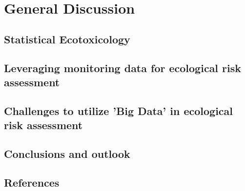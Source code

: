 \chapter{General Discussion}
\label{sec:discussion} 
 
\section{Statistical Ecotoxicology}




\section{Leveraging monitoring data for ecological risk assessment}



\section{Challenges to utilize 'Big Data' in ecological risk assessment}




\section{Conclusions and outlook}





\section{References}
\printbibliography[heading=none, sorting=nyt]
